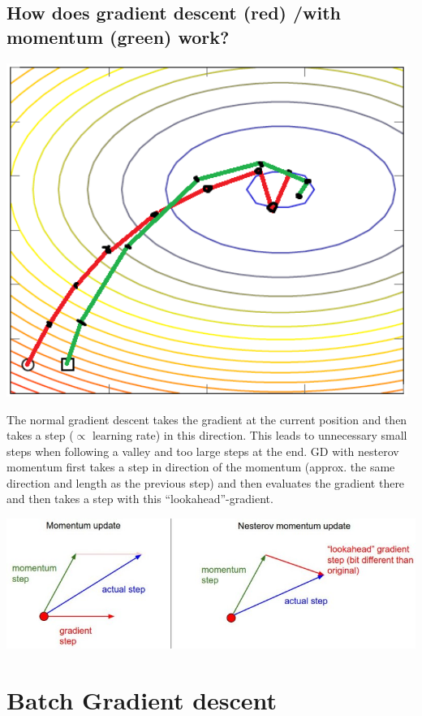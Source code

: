 \subsection{How does gradient descent (red) /with momentum (green) work? }
\begin{minipage}{0.35\textwidth}
\includegraphics[width=0.98\textwidth]{./img/gradient.PNG}
\end{minipage}\begin{minipage}{0.65\textwidth}The normal gradient descent takes the gradient at the current position and then takes a step ($\propto$ learning rate) in this direction. This leads to unnecessary small steps when following a valley and too large steps at the end. GD with nesterov momentum first takes a step in direction of the momentum (approx. the same direction and length as the previous step) and then evaluates the gradient there and then takes a step with this ``lookahead''-gradient.

\includegraphics[width=\textwidth]{./img/nesterov.jpeg}
\end{minipage}


\section{Batch Gradient descent}
